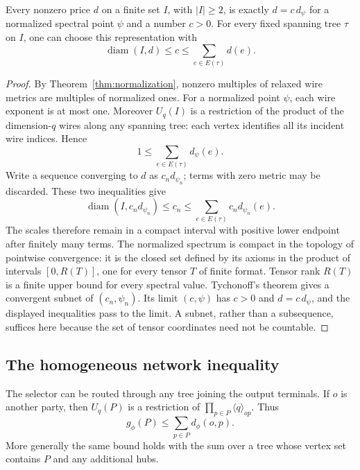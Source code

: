 \begin{corollary}\label{cor:price-attained}
Every nonzero price $d$ on a finite set $I$, with $|I|\geq2$, is exactly $d=c\,d_\psi$ for a normalized spectral point $\psi$ and a number $c>0$. For every fixed spanning tree $\tau$ on $I$, one can choose this representation with
\begin{equation}\label{eq:price-scale-bounds}
 \operatorname{diam}(I,d)\leq c\leq\sum_{e\in E(\tau)}d(e).
\end{equation}
\end{corollary}
\begin{proof}
By Theorem~\ref{thm:normalization}, nonzero multiples of relaxed wire metrics are multiples of normalized ones. For a normalized point $\psi$, each wire exponent is at most one. Moreover $U_q(I)$ is a restriction of the product of the dimension-$q$ wires along any spanning tree: each vertex identifies all its incident wire indices. Hence
\[
 1\leq\sum_{e\in E(\tau)}d_\psi(e).
\]
Write a sequence converging to $d$ as $c_n d_{\psi_n}$; terms with zero metric may be discarded. These two inequalities give
\[
 \operatorname{diam}(I,c_nd_{\psi_n})\leq c_n
 \leq\sum_{e\in E(\tau)}c_nd_{\psi_n}(e).
\]
The scales therefore remain in a compact interval with positive lower endpoint after finitely many terms. The normalized spectrum is compact in the topology of pointwise convergence: it is the closed set defined by its axioms in the product of intervals $[0,R(T)]$, one for every tensor $T$ of finite format. Tensor rank $R(T)$ is a finite upper bound for every spectral value. Tychonoff's theorem gives a convergent subnet of $(c_n,\psi_n)$. Its limit $(c,\psi)$ has $c>0$ and $d=c\,d_\psi$, and the displayed inequalities pass to the limit. A subnet, rather than a subsequence, suffices here because the set of tensor coordinates need not be countable.
\end{proof}

\subsection{The homogeneous network inequality}
The selector can be routed through any tree joining the output terminals. If $o$ is another party, then $U_q(P)$ is a restriction of $\prod_{p\in P}\langle q\rangle_{op}$. Thus
\begin{equation}\label{eq:selector-star}
 g_\phi(P)\leq\sum_{p\in P}d_\phi(o,p).
\end{equation}
More generally the same bound holds with the sum over a tree whose vertex set contains $P$ and any additional hubs.

